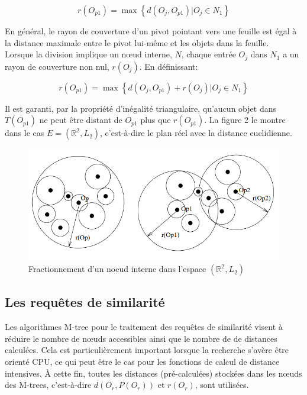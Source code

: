 \begin{equation}
	r(O_{p1}) = \max \left\{d(O_j, O_{p1}) | O_j \in N_1 \right\}
\end{equation}

En général, le rayon de couverture d'un pivot pointant vers une feuille est égal à la distance maximale entre le pivot lui-même et les objets dans la feuille.\\

Lorsque la division implique un nœud interne, $ N $, chaque entrée $ O_j $ dans $ N_1 $ a un rayon de couverture non nul, $ r(O_j) $. En définissant:

\begin{equation}
r(O_{p1}) = \max \left\{d(O_j, O_{p1}) + r(O_j) | O_j \in N_1 \right\}
\end{equation}

Il est garanti, par la propriété d'inégalité triangulaire, qu'aucun objet dans $ T(O_{p1}) $ ne peut être distant de $  O_{p1} $ plus que $ r(O_{p1}) $. La figure 2 le montre dans le cas $ E = ( \mathbb{R^2}, L_2) $, c'est-à-dire le plan réel avec la distance euclidienne.
\begin{figure}[H]
	\centering
	\includegraphics[width=.6 \textwidth]{Figures/splitexep.png} %
	\caption{Fractionnement d'un noeud interne dans l'espace  $ ( \mathbb{R^2}, L_2) $}
\end{figure} 

\subsection{Les requêtes de similarité}
Les algorithmes M-tree pour le traitement des requêtes de similarité visent à réduire le nombre de nœuds accessibles ainsi que le nombre de  de distances calculées. Cela est particulièrement important lorsque la recherche s'avère être orienté CPU, ce qui peut être le cas pour les fonctions de calcul de distance intensives. À cette fin, toutes les distances (pré-calculées) stockées dans les nœuds des M-trees, c'est-à-dire $ d(O_r, P(O_r)) $ et $ r(O_r) $, sont utilisées.

